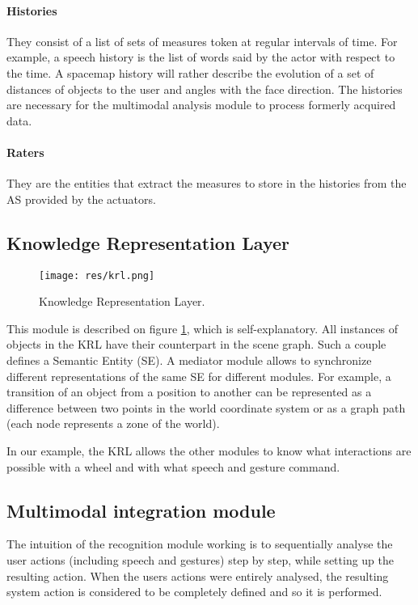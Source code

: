 \documentclass[a4paper]{article}
\begin{document}
\paragraph{Histories} They consist of a list of sets of measures token at regular intervals of time. For example, a speech history is the list of words said by the actor with respect to the time. A spacemap history will rather describe the evolution of a set of distances of objects to the user and angles with the face direction. The histories are necessary for the multimodal analysis module to process formerly acquired data.

\paragraph{Raters} They are the entities that extract the measures to store in the histories from the AS provided by the actuators.

\subsection{Knowledge Representation Layer}

\begin{figure}
\centering
\texttt{[image: res/krl.png]}
\caption{\label{fig:krl}Knowledge Representation Layer.}
\end{figure}

This module is described on figure \ref{fig:krl}, which is self-explanatory. All instances of objects in the KRL have their counterpart in the scene graph. Such a couple defines a Semantic Entity (SE). A mediator module allows to synchronize different representations of the same SE for different modules. For example, a transition of an object from a position to another can be represented as a difference between two points in the world coordinate system or as a graph path (each node represents a zone of the world).

In our example, the KRL allows the other modules to know what interactions are possible with a wheel and with what speech and gesture command.

\subsection{Multimodal integration module}
\label{subsec:recognition}
The intuition of the recognition module working is to sequentially analyse the user actions (including speech and gestures) step by step, while setting up the resulting action. When the users actions were entirely analysed, the resulting system action is considered to be completely defined and so it is performed.
\end{document}
